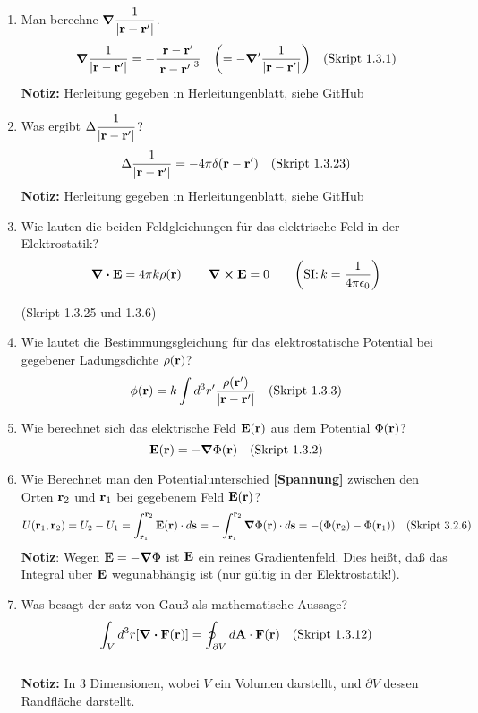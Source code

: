 \begin{enumerate}
  \item Man berechne $\displaystyle \grad\frac{1}{\abs{\vb{r}-\vb{r}'}}$.
        $$\displaystyle \grad\frac{1}{\abs{\vb{r}-\vb{r}'}}=
         -\frac{\vb r -\vb r'}{\abs{\vb r - \vb r'}^3}\quad
         \qty(=-\grad'\frac{1}{\abs{\vb{r}-\vb{r}'}})\quad\text{(Skript 1.3.1)}$$ 
    \textbf{Notiz:} Herleitung gegeben in Herleitungenblatt, siehe GitHub

  \item Was ergibt $\displaystyle \Delta\frac{1}{\abs{\vb{r}-\vb{r}'}}$?
        $$\displaystyle \Delta \frac{1}{\abs{\vb{r}-\vb{r}'}} = -4\pi \delta(\vb r-\vb r')
        \quad\text{(Skript 1.3.23)}$$
    \textbf{Notiz:} Herleitung gegeben in Herleitungenblatt, siehe GitHub
    
  \item Wie lauten die beiden Feldgleichungen für das 
        elektrische Feld in der Elektrostatik?
        $$\displaystyle \div \vb E=4\pi k\rho(\vb r)\,\qquad\curl\vb E=0
         \qquad\qty(\text{SI:}\,k=\frac{1}{4\pi\epsilon_0})$$
        \begin{center}
          (Skript 1.3.25 und 1.3.6)
        \end{center}
  
  \item Wie lautet die Bestimmungsgleichung für das elektrostatische 
        Potential bei gegebener Ladungsdichte $\rho(\vb r)$?
        $$\phi(\vb r)=k\int d^3r'\frac{\rho(\vb r')}{\abs{\vb{r}-\vb{r}'}}
        \quad\text{(Skript 1.3.3)}$$

  \item Wie berechnet sich das elektrische Feld $\vb E (\vb r)$ aus dem
        Potential $\Phi(\vb r)$?
        $$\displaystyle \vb E(\vb r) = - \grad \Phi (\vb r)
        \quad\text{(Skript 1.3.2)}$$

  \item Wie Berechnet man den Potentialunterschied \textbf{[Spannung]}
        zwischen den Orten 
        $\vb r_2$ und $\vb r_1$ bei gegebenem Feld $\vb E(\vb r)$?
        $$\displaystyle U(\vb r_1, \vb r_2)=U_2-U_1
         =\int_{\vb r_1}^{\vb r_2} \vb E(\vb r)\cdot d\vb s
         =-\int_{\vb r_1}^{\vb r_2} \vb \grad \Phi (\vb r)\cdot d\vb s
         =-\qty(\Phi(\vb r_2)-\Phi(\vb r_1))
         \quad\text{(Skript 3.2.6)}$$
        \textbf{Notiz}: Wegen $\vb E=-\grad\Phi$ ist $\vb E$ ein reines
        Gradientenfeld. Dies heißt, daß das Integral über $\vb E$
        wegunabhängig ist (nur gültig in der Elektrostatik!).

  \item Was besagt der satz von Gauß als mathematische Aussage?
        $$\displaystyle \int_V d^3r \qty[\div \vb F(\vb r)]=
         \oint_{\partial V}d\vb A\cdot \vb F(\vb r)
         \quad\text{(Skript 1.3.12)}$$\\
        \textbf{Notiz:} In 3 Dimensionen, wobei $V$ ein Volumen darstellt,
        und $\partial V$ dessen Randfläche darstellt.


\end{enumerate}
